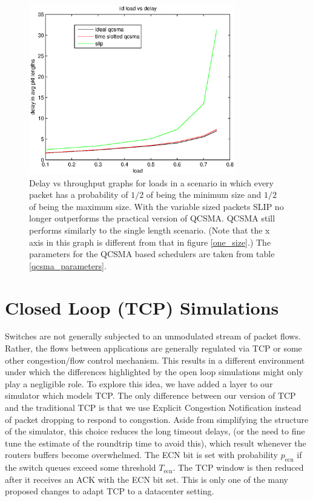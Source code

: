 \documentclass[11pt]{article}%
\begin{document}
\begin{figure}%
	 \includegraphics[width=90mm]{vs_load.eps}
	 \caption{Delay vs throughput graphs for loads in a scenario in which every packet has a probability of $1/2$ of being the minimum size and $1/2$ of being the maximum size. With the variable sized packets SLIP no longer outperforms the practical version of QCSMA.  QCSMA still performs similarly to the single length scenario.  (Note that the x axis in this graph is different from that in figure \ref{one_size}.) The parameters for the QCSMA based schedulers are taken from table \ref{qcsma_parameters}.} 	
	\label{variable_size}
\end{figure}

\section{Closed Loop (TCP) Simulations} \label{closed}


Switches are not generally subjected to an unmodulated stream of packet flows.  Rather, the flows between applications are generally regulated via TCP or some other congestion/flow control mechanism.  This results in a different environment under which the differences highlighted by the open loop simulations might only play a negligible role.  To explore this idea, we have added a layer to our simulator which models TCP.  The only difference between our version of TCP and the traditional TCP is that we use Explicit Congestion Notification instead of packet dropping to respond to congestion.  Aside from simplifying the structure of the simulator, this choice reduces the long timeout delays, (or the need to fine tune the estimate of the roundtrip time to avoid this), which result whenever the routers buffers become overwhelmed.  The ECN bit is set with probability $p_{\text{ecn}}$ if the switch queues exceed some threshold $T_{\text{ecn}}$.  The TCP window is then reduced after it receives an ACK with the ECN bit set.  This is only one of the many proposed changes to adapt TCP to a datacenter setting.
\end{document}
